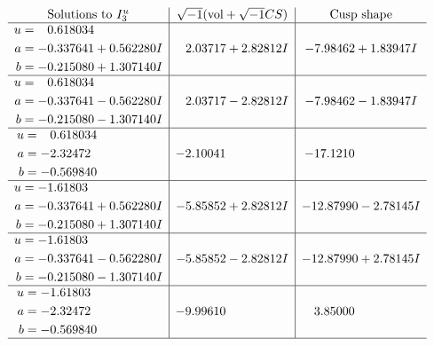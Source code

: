 \documentclass[1p]{elsarticle_modified}
\theoremstyle{definition}
\newcommand{\I}{\sqrt{-1}}
\begin{document}
$$\begin{array}{c|c|c}  
\text{Solutions to }I^u_{3}& \I (\text{vol} + \sqrt{-1}CS) & \text{Cusp shape}\\
 \hline 
\begin{aligned}
u &= \phantom{-}0.618034\phantom{ +0.000000I} \\
a &= -0.337641 + 0.562280 I \\
b &= -0.215080 + 1.307140 I\end{aligned}
 & \phantom{-}2.03717 + 2.82812 I & -7.98462 + 1.83947 I \\ \hline\begin{aligned}
u &= \phantom{-}0.618034\phantom{ +0.000000I} \\
a &= -0.337641 - 0.562280 I \\
b &= -0.215080 - 1.307140 I\end{aligned}
 & \phantom{-}2.03717 - 2.82812 I & -7.98462 - 1.83947 I \\ \hline\begin{aligned}
u &= \phantom{-}0.618034\phantom{ +0.000000I} \\
a &= -2.32472\phantom{ +0.000000I} \\
b &= -0.569840\phantom{ +0.000000I}\end{aligned}
 & -2.10041\phantom{ +0.000000I} & -17.1210\phantom{ +0.000000I} \\ \hline\begin{aligned}
u &= -1.61803\phantom{ +0.000000I} \\
a &= -0.337641 + 0.562280 I \\
b &= -0.215080 + 1.307140 I\end{aligned}
 & -5.85852 + 2.82812 I & -12.87990 - 2.78145 I \\ \hline\begin{aligned}
u &= -1.61803\phantom{ +0.000000I} \\
a &= -0.337641 - 0.562280 I \\
b &= -0.215080 - 1.307140 I\end{aligned}
 & -5.85852 - 2.82812 I & -12.87990 + 2.78145 I \\ \hline\begin{aligned}
u &= -1.61803\phantom{ +0.000000I} \\
a &= -2.32472\phantom{ +0.000000I} \\
b &= -0.569840\phantom{ +0.000000I}\end{aligned}
 & -9.99610\phantom{ +0.000000I} & \phantom{-}3.85000\phantom{ +0.000000I}\\
 \hline 
 \end{array}$$\newpage
\end{document}
